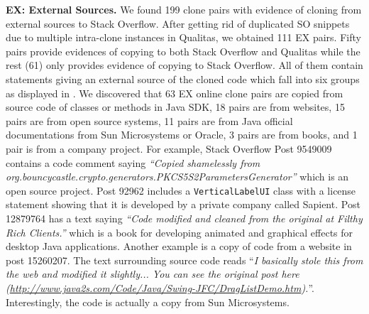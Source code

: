 \documentclass[10pt,journal,compsoc]{IEEEtran}
\begin{document}
\textbf{EX: External Sources.} We found 199 clone pairs with evidence of cloning
from external sources to Stack Overflow. After getting rid of duplicated SO
snippets due to multiple intra-clone instances in Qualitas, we obtained 111 EX
pairs. Fifty pairs provide evidences of copying to both Stack
Overflow and Qualitas while the rest (61) only provides evidence of copying to
Stack Overflow. All of them contain statements giving an external source of the
cloned code which fall into six groups as displayed in . 
We discovered that 63 EX online clone pairs are copied from source code of classes or 
methods in Java SDK, 18 pairs are from websites, 15 pairs are from open source systems,
11 pairs are from Java official documentations from Sun Microsystems or Oracle,
3 pairs are from books, and 1 pair is from a company project.
For example, Stack Overflow Post
9549009 contains a code comment saying \textit{``Copied shamelessly from
	org.bouncycastle.crypto.generators.PKCS5S2ParametersGenerator''} which is an
open source project. Post 92962 includes a {\small\texttt{VerticalLabelUI}}
class with a license statement showing that it is developed by a private company
called \textsf{Sapient}. Post 12879764 has a text saying \textit{``Code modified
	and cleaned from the original at Filthy Rich Clients.''} which is a book for
developing animated and graphical effects for desktop Java applications. Another
example is a copy of code from a website in post 15260207. The text surrounding
source code reads ``\textit{I basically stole this from the web and modified it
	slightly... You can see the original post here
	(\url{http://www.java2s.com/Code/Java/Swing-JFC/DragListDemo.htm}).}''.
Interestingly, the code is actually a copy from Sun Microsystems.
\end{document}
